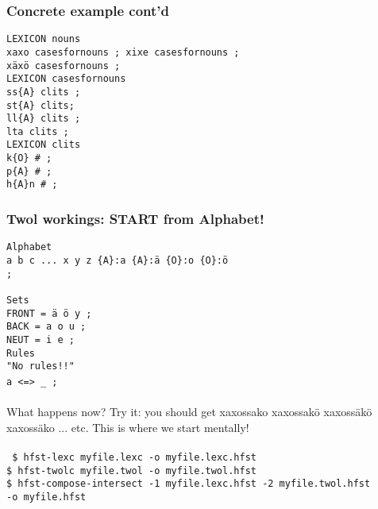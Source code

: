 \documentclass[10pt,xetex]{beamer} %
\begin{document}
\begin{frame}
    \frametitle{Concrete example cont'd}
    \texttt{LEXICON nouns\\
        xaxo casesfornouns ; xixe casesfornouns ; \\
        xäxö casesfornouns ;\\
        LEXICON casesfornouns\\
        ss\{A\} clits ;  \\
	st\{A\} clits;  \\
	ll\{A\} clits ;  \\
	lta clits ; \\
        LEXICON clits\\
        k\{O\} \# ;  \\
	p\{A\} \# ;  \\
	h\{A\}n \# ;\\
    }
\end{frame}
%
\begin{frame}
    \frametitle{Twol workings: START from Alphabet!}
    \texttt{Alphabet\\
        a b c ... x y z \{A\}:a \{A\}:ä \{O\}:o \{O\}:ö\\
        ;\\
        ~\\
        Sets \\
        FRONT = ä ö y ;\\
        BACK = a o u ;\\
        NEUT = i e ;\\
        Rules\\
        "No rules!!"\\
        a <=> \_ ;
    }
~\\
~\\
    What happens now? Try it: you should get xaxossako xaxossakö xaxossäkö
    xaxossäko ... etc. This is where we start mentally!
~\\
~\\
\texttt{
\$ hfst-lexc myfile.lexc -o myfile.lexc.hfst \\
\$ hfst-twolc myfile.twol -o myfile.twol.hfst \\
\$ hfst-compose-intersect -1 myfile.lexc.hfst -2 myfile.twol.hfst \\-o myfile.hfst \\
}
\end{frame}
%
\end{document}
